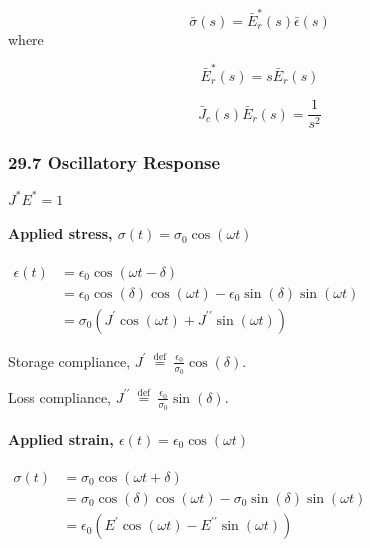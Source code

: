 \[
\bar{\sigma}(s)=\bar{E}_{r}^{*}(s) \bar{\epsilon}(s)
\] where

\[
\bar{E}_{r}^{*}(s)=s \bar{E}_{r}(s)
\]

\[
\bar{J}_{c}(s) \bar{E}_{r}(s)=\frac{1}{s^{2}}
\]

\hypertarget{oscillatory-response}{%
\subsubsection{29.7 Oscillatory Response}\label{oscillatory-response}}

\(J^{*} E^{*}=1\)

\hypertarget{applied-stress-sigmatsigma_0-cos-omega-t}{%
\paragraph{\texorpdfstring{Applied stress,
\(\sigma(t)=\sigma_{0} \cos (\omega t)\)}{Applied stress, \textbackslash sigma(t)=\textbackslash sigma\_\{0\} \textbackslash cos (\textbackslash omega t)}}\label{applied-stress-sigmatsigma_0-cos-omega-t}}

\(\begin{aligned} \epsilon(t) &=\epsilon_{0} \cos (\omega t-\delta) \\ &=\epsilon_{0} \cos (\delta) \cos (\omega t)-\epsilon_{0} \sin (\delta) \sin (\omega t) \\ &=\sigma_{0}\left(J^{\prime} \cos (\omega t)+J^{\prime \prime} \sin (\omega t)\right) \end{aligned}\)

Storage compliance,
\(J^{\prime} \stackrel{\text { def }}{=} \frac{\epsilon_{0}}{\sigma_{0}} \cos (\delta)\).

Loss compliance,
\(J^{\prime \prime} \stackrel{\text { def }}{=} \frac{\epsilon_{0}}{\sigma_{0}} \sin (\delta)\).

\hypertarget{applied-strain-epsilontepsilon_0-cos-omega-t}{%
\paragraph{\texorpdfstring{Applied strain,
\(\epsilon(t)=\epsilon_{0} \cos (\omega t)\)}{Applied strain, \textbackslash epsilon(t)=\textbackslash epsilon\_\{0\} \textbackslash cos (\textbackslash omega t)}}\label{applied-strain-epsilontepsilon_0-cos-omega-t}}

\(\begin{aligned} \sigma(t) &=\sigma_{0} \cos (\omega t+\delta) \\ &=\sigma_{0} \cos (\delta) \cos (\omega t)-\sigma_{0} \sin (\delta) \sin (\omega t) \\ & =\epsilon_{0}\left(E^{\prime} \cos (\omega t)-E^{\prime \prime} \sin (\omega t)\right)\end{aligned}\)

